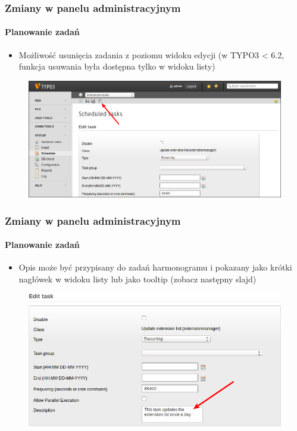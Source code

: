 
\begin{frame}[fragile]
	\frametitle{Zmiany w panelu administracyjnym}
	\framesubtitle{Planowanie zadań}
	\begin{itemize}
		\item Możliwość usunięcia zadania z poziomu widoku edycji \newline
			\small(w TYPO3 < 6.2, funkcja usuwania była dostępna tylko w widoku listy)\normalsize
	\end{itemize}

	\begin{figure}
		\includegraphics[width=0.95\linewidth]{Images/BackendChanges/DeleteSchedulerTaskInEditView.png}
	\end{figure}

\end{frame}


\begin{frame}[fragile]
	\frametitle{Zmiany w panelu administracyjnym}
	\framesubtitle{Planowanie zadań}

	\begin{itemize}
		\item Opis może być przypisany do zadań harmonogramu i pokazany jako krótki nagłówek w widoku listy lub jako tooltip (zobacz następny slajd)
	\end{itemize}

	\begin{figure}
		\includegraphics[width=0.7\linewidth]{Images/BackendChanges/SchedulerTaskDescription.png}
	\end{figure}

\end{frame}

